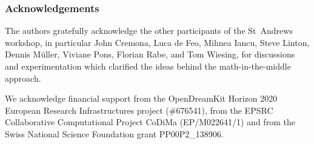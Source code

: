 \subsubsection*{Acknowledgements}

The authors gratefully acknowledge the other participants of the St~Andrews workshop, in
particular John Cremona, Luca de Feo, Mihnea Iancu, Steve Linton, Dennis M\"uller, Viviane
Pons, Florian Rabe, and Tom Wiesing, for discussions and experimentation which clarified
the ideas behind the math-in-the-middle approach.

We acknowledge financial support from the OpenDreamKit Horizon 2020 European Research
Infrastructures project (\#676541), from the EPSRC Collaborative Computational Project
CoDiMa (EP/M022641/1) and from the Swiss National Science Foundation grant PP00P2\_138906.


